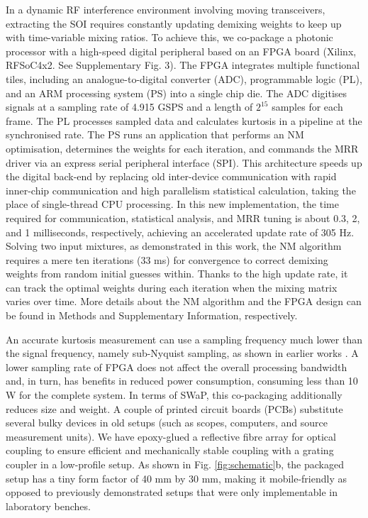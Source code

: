 \documentclass[pdflatex,mathphys]{sty}%
\begin{document}
In a dynamic RF interference environment involving moving transceivers, extracting the SOI requires constantly updating demixing weights to keep up with time-variable mixing ratios. To achieve this, we co-package a photonic processor with a high-speed digital peripheral based on an FPGA board (Xilinx, RFSoC4x2. See Supplementary Fig. 3). The FPGA integrates multiple functional tiles, including an analogue-to-digital converter (ADC), programmable logic (PL), and an ARM processing system (PS) into a single chip die. The ADC digitises signals at a sampling rate of 4.915 GSPS and a length of $2^{15}$ samples for each frame. The PL processes sampled data and calculates kurtosis in a pipeline at the synchronised rate. The PS runs an application that performs an NM optimisation, determines the weights for each iteration, and commands the MRR driver via an express serial peripheral interface (SPI). This architecture speeds up the digital back-end by replacing old inter-device communication with rapid inner-chip communication and high parallelism statistical calculation, taking the place of single-thread CPU processing. In this new implementation, the time required for communication, statistical analysis, and MRR tuning is about 0.3, 2, and 1 milliseconds, respectively, achieving an accelerated update rate of 305 Hz. Solving two input mixtures, as demonstrated in this work, the NM algorithm requires a mere ten iterations (33 ms) for convergence to correct demixing weights from random initial guesses within. Thanks to the high update rate, it can track the optimal weights during each iteration when the mixing matrix varies over time. More details about the NM algorithm and the FPGA design can be found in Methods and Supplementary Information, respectively.

An accurate kurtosis measurement can use a sampling frequency much lower than the signal frequency, namely sub-Nyquist sampling, as shown in earlier works \cite{ma2020photonic, tait2018blind}. A lower sampling rate of FPGA does not affect the overall processing bandwidth and, in turn, has benefits in reduced power consumption, consuming less than 10 W for the complete system. In terms of SWaP, this co-packaging additionally reduces size and weight. A couple of printed circuit boards (PCBs) substitute several bulky devices in old setups (such as scopes, computers, and source measurement units). We have epoxy-glued a reflective fibre array for optical coupling to ensure efficient and mechanically stable coupling with a grating coupler in a low-profile setup. As shown in Fig. \ref{fig:schematic}b, the packaged setup has a tiny form factor of 40 mm by 30 mm, making it mobile-friendly as opposed to previously demonstrated setups that were only implementable in laboratory benches.
\end{document}
